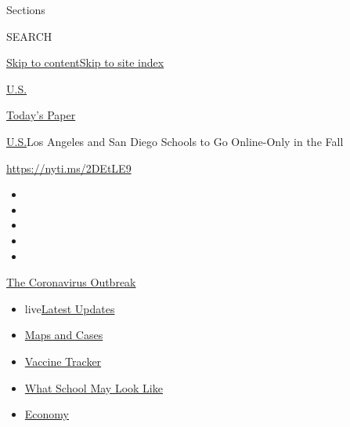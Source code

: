 Sections

SEARCH

\protect\hyperlink{site-content}{Skip to
content}\protect\hyperlink{site-index}{Skip to site index}

\href{https://www.nytimes.com/section/us}{U.S.}

\href{https://myaccount.nytimes.com/auth/login?response_type=cookie\&client_id=vi}{}

\href{https://www.nytimes.com/section/todayspaper}{Today's Paper}

\href{/section/us}{U.S.}\textbar{}Los Angeles and San Diego Schools to
Go Online-Only in the Fall

\url{https://nyti.ms/2DEtLE9}

\begin{itemize}
\item
\item
\item
\item
\item
\end{itemize}

\href{https://www.nytimes.com/news-event/coronavirus?action=click\&pgtype=Article\&state=default\&region=TOP_BANNER\&context=storylines_menu}{The
Coronavirus Outbreak}

\begin{itemize}
\tightlist
\item
  live\href{https://www.nytimes.com/2020/08/01/world/coronavirus-covid-19.html?action=click\&pgtype=Article\&state=default\&region=TOP_BANNER\&context=storylines_menu}{Latest
  Updates}
\item
  \href{https://www.nytimes.com/interactive/2020/us/coronavirus-us-cases.html?action=click\&pgtype=Article\&state=default\&region=TOP_BANNER\&context=storylines_menu}{Maps
  and Cases}
\item
  \href{https://www.nytimes.com/interactive/2020/science/coronavirus-vaccine-tracker.html?action=click\&pgtype=Article\&state=default\&region=TOP_BANNER\&context=storylines_menu}{Vaccine
  Tracker}
\item
  \href{https://www.nytimes.com/interactive/2020/07/29/us/schools-reopening-coronavirus.html?action=click\&pgtype=Article\&state=default\&region=TOP_BANNER\&context=storylines_menu}{What
  School May Look Like}
\item
  \href{https://www.nytimes.com/live/2020/07/31/business/stock-market-today-coronavirus?action=click\&pgtype=Article\&state=default\&region=TOP_BANNER\&context=storylines_menu}{Economy}
\end{itemize}

